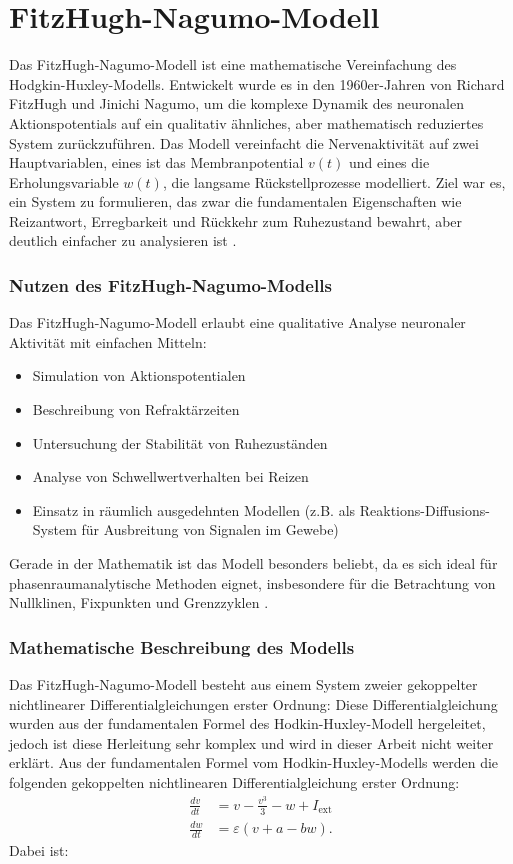 \section{FitzHugh-Nagumo-Modell}
Das FitzHugh-Nagumo-Modell ist eine mathematische Vereinfachung des Hodgkin-Huxley-Modells. Entwickelt wurde es in den 1960er-Jahren von Richard FitzHugh und Jinichi Nagumo, um die komplexe Dynamik des neuronalen Aktionspotentials auf ein qualitativ ähnliches, aber mathematisch reduziertes System zurückzuführen.
%
%
%
Das Modell vereinfacht die Nervenaktivität auf zwei Hauptvariablen, eines ist das Membranpotential $v(t)$ und eines die Erholungsvariable $w(t)$, die langsame Rückstellprozesse modelliert.
%
%
Ziel war es, ein System zu formulieren, das zwar die fundamentalen Eigenschaften wie Reizantwort, Erregbarkeit und Rückkehr zum Ruhezustand bewahrt, aber deutlich einfacher zu analysieren ist 
%
%
\cite{nerven:InaLammers.31.08.2015}.
\subsubsection{Nutzen des FitzHugh-Nagumo-Modells}
Das FitzHugh-Nagumo-Modell erlaubt eine qualitative Analyse neuronaler Aktivität mit einfachen Mitteln:
\begin{itemize}
    \item Simulation von Aktionspotentialen
    \item Beschreibung von Refraktärzeiten
    \item Untersuchung der Stabilität von Ruhezuständen
    \item Analyse von Schwellwertverhalten bei Reizen
    \item Einsatz in räumlich ausgedehnten Modellen (z.B. als Reaktions-Diffusions-System für Ausbreitung von Signalen im Gewebe)
\end{itemize}

Gerade in der Mathematik ist das Modell besonders beliebt, da es sich ideal für phasenraumanalytische Methoden eignet,
insbesondere für die Betrachtung von Nullklinen, Fixpunkten und Grenzzyklen 
%
%
%
\cite{nerven:InaLammers.31.08.2015}.
\subsubsection{Mathematische Beschreibung des Modells}
Das FitzHugh-Nagumo-Modell besteht aus einem System zweier gekoppelter nichtlinearer Differentialgleichungen erster Ordnung:
Diese Differentialgleichung wurden aus der fundamentalen Formel des Hodkin-Huxley-Modell hergeleitet, jedoch ist diese Herleitung sehr komplex und wird in dieser Arbeit nicht weiter erklärt. Aus der fundamentalen Formel vom Hodkin-Huxley-Modells werden die folgenden gekoppelten nichtlinearen Differentialgleichung erster Ordnung:
\begin{align*}
	\frac{dv}{dt} &= v - \frac{v^3}{3} - w + I_{\text{ext}} \\
	\frac{dw}{dt} &= \varepsilon (v + a - b w).
\end{align*}
Dabei ist:

